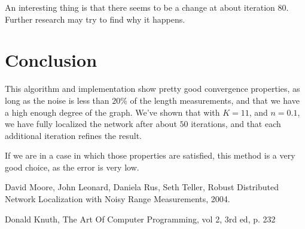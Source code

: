 \documentclass[letterpaper, 10 pt, conference]{ieeeconf}  %
\begin{document}
An interesting thing is that there seems to be a change at about iteration $80$. Further research may try to find why it happens.


\section{Conclusion}

This algorithm and implementation show pretty good convergence properties, as long as the noise is less than $20\%$ of the length measurements, and that we have a high enough degree of the graph. We've shown that with $K=11$, and $n=0.1$, we have fully localized the network after about $50$ iterations, and that each additional iteration refines the result.

If we are in a case in which those properties are satisfied, this method is a very good choice, as the error is very low.

\begin{thebibliography}{99}

 David Moore, John Leonard, Daniela Rus, Seth Teller, Robust Distributed Network Localization with Noisy Range Measurements, 2004.

 Donald Knuth, The Art Of Computer Programming, vol 2, 3rd ed, p. 232





\end{thebibliography}
\end{document}
